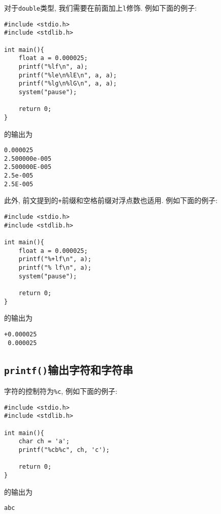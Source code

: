             对于\texttt{double}类型, 我们需要在前面加上\texttt{l}修饰. 例如下面的例子:
\begin{lstlisting}
#include <stdio.h>
#include <stdlib.h>

int main(){
    float a = 0.000025;
    printf("%lf\n", a);
    printf("%le\n%lE\n", a, a);
    printf("%lg\n%lG\n", a, a);
    system("pause");

    return 0;
}
\end{lstlisting}
            的输出为
\begin{lstlisting}
0.000025
2.500000e-005
2.500000E-005
2.5e-005
2.5E-005
\end{lstlisting}

            此外, 前文提到的\texttt{+}前缀和空格前缀对浮点数也适用. 例如下面的例子:
\begin{lstlisting}
#include <stdio.h>
#include <stdlib.h>

int main(){
    float a = 0.000025;
    printf("%+lf\n", a);
    printf("% lf\n", a);
    system("pause");

    return 0;
}
\end{lstlisting}
            的输出为
\begin{lstlisting}
+0.000025
 0.000025
\end{lstlisting}

        \subsection*{\texttt{printf()}输出字符和字符串}
            字符的控制符为\texttt{\%c}, 例如下面的例子:
\begin{lstlisting}
#include <stdio.h>
#include <stdlib.h>

int main(){
    char ch = 'a';
    printf("%cb%c", ch, 'c');

    return 0;
}
\end{lstlisting}
            的输出为
\begin{lstlisting}
abc
\end{lstlisting}

